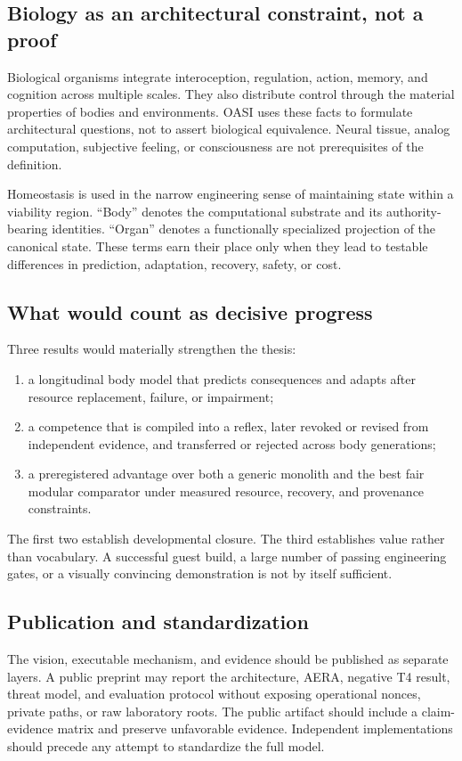 \documentclass[journal,10pt]{IEEEtran}
\newcommand{\OASI}{\textsc{OASI}}
\newcommand{\AERA}{\textsc{AERA}}
\begin{document}
\subsection{Biology as an architectural constraint, not a proof}
Biological organisms integrate interoception, regulation, action, memory, and cognition across multiple scales. They also distribute control through the material properties of bodies and environments. \OASI{} uses these facts to formulate architectural questions, not to assert biological equivalence. Neural tissue, analog computation, subjective feeling, or consciousness are not prerequisites of the definition.

Homeostasis is used in the narrow engineering sense of maintaining state within a viability region. ``Body'' denotes the computational substrate and its authority-bearing identities. ``Organ'' denotes a functionally specialized projection of the canonical state. These terms earn their place only when they lead to testable differences in prediction, adaptation, recovery, safety, or cost.

\subsection{What would count as decisive progress}
Three results would materially strengthen the thesis:
\begin{enumerate}
  \item a longitudinal body model that predicts consequences and adapts after resource replacement, failure, or impairment;
  \item a competence that is compiled into a reflex, later revoked or revised from independent evidence, and transferred or rejected across body generations;
  \item a preregistered advantage over both a generic monolith and the best fair modular comparator under measured resource, recovery, and provenance constraints.
\end{enumerate}
The first two establish developmental closure. The third establishes value rather than vocabulary. A successful guest build, a large number of passing engineering gates, or a visually convincing demonstration is not by itself sufficient.

\subsection{Publication and standardization}
The vision, executable mechanism, and evidence should be published as separate layers. A public preprint may report the architecture, \AERA{}, negative T4 result, threat model, and evaluation protocol without exposing operational nonces, private paths, or raw laboratory roots. The public artifact should include a claim-evidence matrix and preserve unfavorable evidence. Independent implementations should precede any attempt to standardize the full model.
\end{document}
